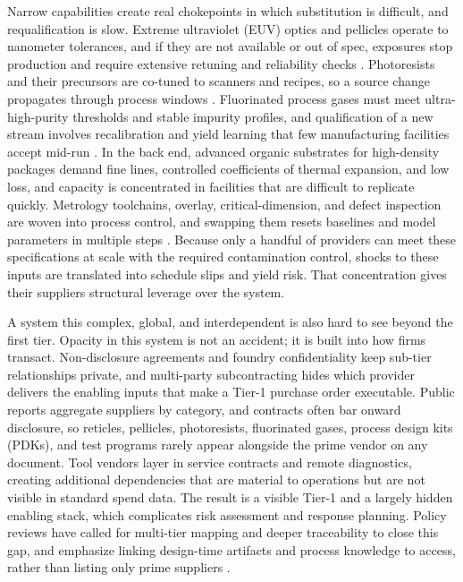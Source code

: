 Narrow capabilities create real chokepoints in which substitution is difficult, and requalification is slow. Extreme ultraviolet (EUV) optics and pellicles operate to nanometer tolerances, and if they are not available or out of spec, exposures stop production and require extensive retuning and reliability checks \parencite{asml_2024_2024,neisser_international_2021}. Photoresists and their precursors are co-tuned to scanners and recipes, so a source change propagates through process windows \parencite{irds_lithography_technical_working_group_international_2023}. Fluorinated process gases must meet ultra-high-purity thresholds and stable impurity profiles, and qualification of a new stream involves recalibration and yield learning that few manufacturing facilities accept mid-run \parencite{irds_lithography_technical_working_group_international_2023}. In the back end, advanced organic substrates for high-density packages demand fine lines, controlled coefficients of thermal expansion, and low loss, and capacity is concentrated in facilities that are difficult to replicate quickly. Metrology toolchains, overlay, critical-dimension, and defect inspection are woven into process control, and swapping them resets baselines and model parameters in multiple steps \parencite{irds_metrology_technical_working_group_international_2023}. Because only a handful of providers can meet these specifications at scale with the required contamination control, shocks to these inputs are translated into schedule slips and yield risk. That concentration gives their suppliers structural leverage over the system.

A system this complex, global, and interdependent is also hard to see beyond the first tier. Opacity in this system is not an accident; it is built into how firms transact. Non-disclosure agreements and foundry confidentiality keep sub-tier relationships private, and multi-party subcontracting hides which provider delivers the enabling inputs that make a Tier-1 purchase order executable. Public reports aggregate suppliers by category, and contracts often bar onward disclosure, so reticles, pellicles, photoresists, fluorinated gases, process design kits (PDKs), and test programs rarely appear alongside the prime vendor on any document. Tool vendors layer in service contracts and remote diagnostics, creating additional dependencies that are material to operations but are not visible in standard spend data. The result is a visible Tier-1 and a largely hidden enabling stack, which complicates risk assessment and response planning. Policy reviews have called for multi-tier mapping and deeper traceability to close this gap, and emphasize linking design-time artifacts and process knowledge to access, rather than listing only prime suppliers \parencite{TheWhiteHouse2021,chips_research_development_office_vision_2023, us_department_of_commerce_defense_2009, ch5_dod2022_supplychains}.

